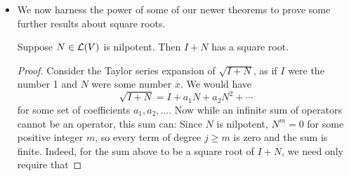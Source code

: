 \documentclass[../main.tex]{subfiles}
\begin{document}
\begin{itemize}
\begin{theorem}
\begin{equation*}
\begin{pmatrix}
                A_1 &  & 0\\
                 & \ddots & \\
                0 &  & A_m\\
            \end{pmatrix}
        \end{equation*}
        where each $A_j$ is a $d_j$-by-$d_j$ upper-triangular matrix of the form
        \begin{equation*}
            A_j =
            \begin{pmatrix}
                \lambda_j &  & *\\
                 & \ddots & \\
                0 &  & \lambda_j\\
            \end{pmatrix}
        \end{equation*}
        \begin{proof}
            Let $j\in\{1,\dots,m\}$ be arbitrary. By Theorem \ref{trm:genEigenDecompc}, $(T-\lambda_jI)|_{G(\lambda_j,T)}$ is nilpotent. Thus, by Theorem \ref{trm:nilpotentMatrix}, we can choose a basis of $G(\lambda_j,T)$ (which will be of length $d_j$) such that $\mat{(T-\lambda_jI)|_{G(\lambda_j,T)}}$ with respect to this basis has all zeroes on and below the diagonal. It follows that $\mat{T|_{G(\lambda_j,T)}}=\mat{(T-\lambda_jI)|_{G(\lambda_j,T)}}+\mat{\lambda_jI|_{G(\lambda_j,T)}}$ will have the necessary form to be an $A_j$. Therefore, since concatenating the bases of each $G(\lambda_j,T)$ gives a basis of $V$ by Theorem \ref{trm:genEigenDecompa}, $\mat{T}$ with respect to this basis will have the desired form.
        \end{proof}
    \end{theorem}
    \item We now harness the power of some of our newer theorems to prove some further results about square roots.
    \begin{theorem}\label{trm:INsquareRoot}
        Suppose $N\in\mathcal{L}(V)$ is nilpotent. Then $I+N$ has a square root.
        \begin{proof}
            Consider the Taylor series expansion of $\sqrt{I+N}$, as if $I$ were the number 1 and $N$ were some number $x$. We would have
            \begin{equation*}
                \sqrt{I+N} = I+a_1N+a_2N^2+\cdots
            \end{equation*}
            for some set of coefficients $a_1,a_2,\dots$. Now while an infinite sum of operators cannot be an operator, this sum can: Since $N$ is nilpotent, $N^m=0$ for some positive integer $m$, so every term of degree $j\geq m$ is zero and the sum is finite. Indeed, for the sum above to be a square root of $I+N$, we need only require that

\end{proof}
\end{theorem}
\end{itemize}
\end{document}
